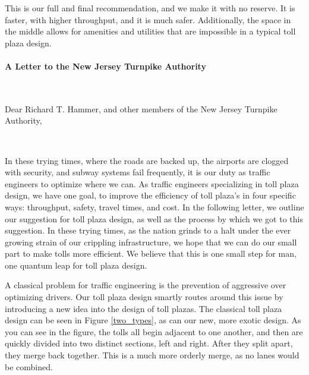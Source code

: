 \documentclass[a4paper, 11pt]{article}
\begin{document}
This is our full and final recommendation, and we make it with no reserve. It is faster, with higher throughput, and it is much safer. Additionally, the space in the middle allows for amenities and utilities that are impossible in a typical toll plaza design. 

\newpage

%
%
%
%
%
%
%
%
%
%
%
%
%
%
%
%
%
%
%
%
%
%
%
%

\paragraph{A Letter to the New Jersey Turnpike Authority}

\

Dear Richard T. Hammer, and other members of the New Jersey Turnpike Authority,

\ 

In these trying times, where the roads are backed up, the airports are clogged with security, and subway systems fail frequently, it is our duty as traffic engineers to optimize where we can. As traffic engineers specializing in toll plaza design, we have one goal, to improve the efficiency of toll plaza's in four specific ways: throughput, safety, travel times, and cost. In the following letter, we outline our suggestion for toll plaza design, as well as the process by which we got to this suggestion. In these trying times, as the nation grinds to a halt under the ever growing strain of our crippling infrastructure, we hope that we can do our small part to make tolls more efficient. 
We believe that this is one small step for man, one quantum leap for toll plaza design.

A classical problem for traffic engineering is the prevention of aggressive over optimizing drivers. Our toll plaza design smartly routes around this issue by introducing a new idea into the design of toll plazas. The classical toll plaza design can be seen in Figure \ref{two_types}, as can our new, more exotic design. As you can see in the figure, the tolls all begin adjacent to one another, and then are quickly divided into two distinct sections, left and right. After they split apart, they merge back together. This is a much more orderly merge, as no lanes would be combined. 
\end{document}
